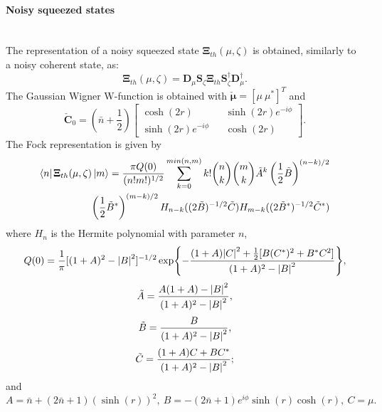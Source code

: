         \paragraph{Noisy squeezed states}\mbox{} \\
        The representation of a noisy squeezed state $\pmb{\Xi}_{th}(\mu,\zeta)$ is obtained,
        similarly to a noisy coherent state, as:
        \begin{equation}
            \pmb{\Xi}_{th}(\mu,\zeta)=\pmb{D}_\mu\pmb{S}_\zeta\pmb{\Xi}_{th}
            \pmb{S}_\zeta^\dagger\pmb{D}_\mu^\dagger.
        \end{equation}
        The Gaussian Wigner W-function is obtained with $\check{\pmb{\mu}}=[\mu\ \mu^*]^T$ and
        \begin{equation*}
            \check{\pmb{C}}_0=\left(\bar{n}+\frac{1}{2}\right)
            \begin{bmatrix}
                \cosh(2r) && \sinh(2r)e^{-i\phi}\\
                \sinh(2r)e^{-i\phi} && \cosh(2r)
            \end{bmatrix}.
        \end{equation*}
        The Fock representation is given by \cite{MarMar_1993}
        \begin{equation}\begin{split}
            \bra{n}\pmb{\Xi}_{th}(\mu,\zeta)\ket{m}=\frac{\pi Q(0)}{(n!m!)^{1/2}}
            \sum_{k=0}^{min(n,m)} k! \binom{n}{k}\binom{m}{k} \tilde{A}^k\left(\frac{1}{2}
            \tilde{B}\right)^{(n-k)/2}\\ \left(\frac{1}{2}\tilde{B}^*\right)^{(m-k)/2}
            H_{n-k}((2\tilde{B})^{-1/2}\tilde{C}) H_{m-k}((2\tilde{B}^*)^{-1/2}\tilde{C}^*) 
            \label{FR_NSS}
        \end{split}\end{equation}
        where $H_n$ is the Hermite polynomial with parameter $n$,
        \begin{equation*}
            Q(0)=\frac{1}{\pi}[(1+A)^2-\absolutevalue{B}^2]^{-1/2}\exp{-\frac{(1+A)\absolutevalue{C}^2
            +\frac{1}{2}[B(C^*)^2+B^*C^2]}{(1+A)^2-\absolutevalue{B}^2}},
        \end{equation*} 
        \begin{equation*}
            \tilde{A}=\frac{A(1+A)-\absolutevalue{B}^2}{(1+A)^2-\absolutevalue{B}^2},
        \end{equation*}
        \begin{equation*}
            \tilde{B}=\frac{B}{(1+A)^2-\absolutevalue{B}^2},
        \end{equation*}
        \begin{equation*}
            \tilde{C}=\frac{(1+A)C+BC^*}{(1+A)^2-\absolutevalue{B}^2};
        \end{equation*}
        and
        \begin{equation*}
            A=\bar{n}+(2\bar{n}+1)(\sinh(r))^2,\ 
            B=-(2\bar{n}+1)e^{i\phi}\sinh(r)\cosh(r),\ 
            C=\mu.
        \end{equation*}